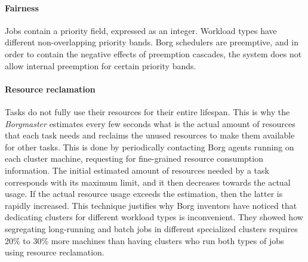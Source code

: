 \paragraph{Fairness}
Jobs contain a priority field, expressed as an integer.
Workload types have different non-overlapping priority bands.
Borg \cite{borg} schedulers are preemptive, and in order to contain the negative effects of preemption cascades, the system does not allow internal preemption for certain priority bands.

\paragraph{Resource reclamation}
Tasks do not fully use their resources for their entire lifespan.
This is why the \textit{Borgmaster} estimates every few seconds what is the actual amount of resources that each task needs and reclaims the unused resources to make them available for other tasks.
This is done by periodically contacting Borg \cite{borg} agents running on each cluster machine, requesting for fine-grained resource consumption information.
The initial estimated amount of resources needed by a task corresponds with its maximum limit, and it then decreases towards the actual usage.
If the actual resource usage exceeds the estimation, then the latter is rapidly increased.
This technique justifies why Borg \cite{borg} inventors have noticed that dedicating clusters for different workload types is inconvenient.
They showed how segregating long-running and batch jobs in different specialized clusters requires 20\% to 30\% more machines than having clusters who run both types of jobs using resource reclamation.

